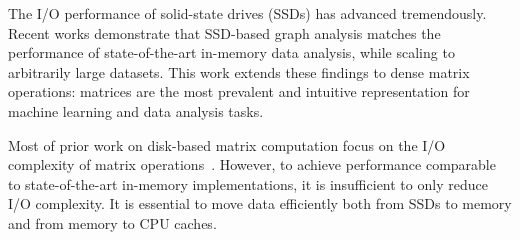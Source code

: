 

The I/O performance of solid-state drives (SSDs) has advanced tremendously.
Recent works \cite{flashgraph, gridgraph} demonstrate that SSD-based 
graph analysis matches the performance of 
state-of-the-art in-memory data analysis, while scaling to arbitrarily large datasets.
This work extends these findings to dense matrix operations: matrices are the most
prevalent and intuitive representation for machine learning and data analysis tasks.





Most of prior work on disk-based matrix computation focus on the I/O
complexity of matrix operations~\cite{Toledo99}. However, to achieve performance
comparable to state-of-the-art in-memory implementations, it is insufficient
to only reduce I/O complexity. It is essential
to move data efficiently both from SSDs to memory and from memory to CPU
caches.


